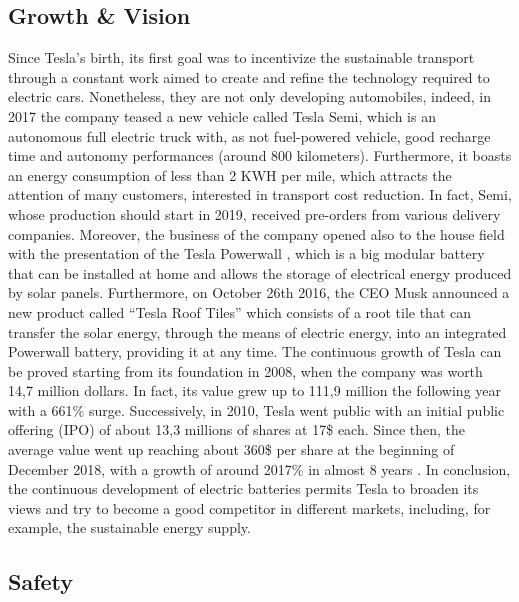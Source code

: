 \subsection{Growth \& Vision}
Since Tesla's birth, its first goal was to incentivize the sustainable transport through a constant work aimed to create and refine the technology required to electric cars. Nonetheless, they are not only developing automobiles, indeed, in 2017 the company teased a new vehicle called Tesla Semi, which is an autonomous full electric truck with, as not fuel-powered vehicle, good recharge time and autonomy performances (around 800 kilometers). Furthermore, it boasts an energy consumption of less than 2 KWH per mile, which attracts the attention of many customers, interested in transport cost reduction. In fact, Semi, whose production should start in 2019, received pre-orders from various delivery companies.  
Moreover, the business of the company opened also to the house field with the presentation of the Tesla Powerwall \cite{Powerwall}, which is a big modular battery that can be installed at home and allows the storage of electrical energy produced by solar panels. Furthermore, on October 26th 2016, the CEO Musk announced a new product called “Tesla Roof Tiles” which consists of a root tile that can transfer the solar energy, through the means of electric energy, into an integrated Powerwall battery, providing it at any time.
The continuous growth of Tesla can be proved starting from its foundation in 2008, when the company was worth 14,7 million dollars. In fact, its value grew up to 111,9 million the following year with a 661\% surge. Successively, in 2010, Tesla went public with an initial public offering (IPO) of about 13,3 millions of shares at 17\$ each. Since then, the average value went up reaching about 360\$ per share at the beginning of December 2018, with a growth of around 2017\% in almost 8 years \cite{Growth}. 
In conclusion, the continuous development of electric batteries permits Tesla to broaden its views and try to become a good competitor in different markets, including, for example, the sustainable energy supply.

\subsection{Safety}

